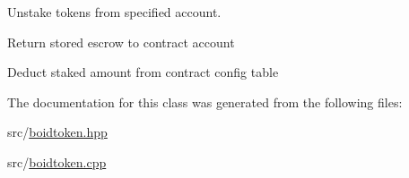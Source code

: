 Unstake tokens from specified account. 


\begin{DoxyItemize}
\item Return stored escrow to contract account
\item Deduct staked amount from contract config table 
\end{DoxyItemize}

The documentation for this class was generated from the following files\+:\begin{DoxyCompactItemize}
\item 
src/\hyperlink{boidtoken_8hpp}{boidtoken.\+hpp}\item 
src/\hyperlink{boidtoken_8cpp}{boidtoken.\+cpp}\end{DoxyCompactItemize}
